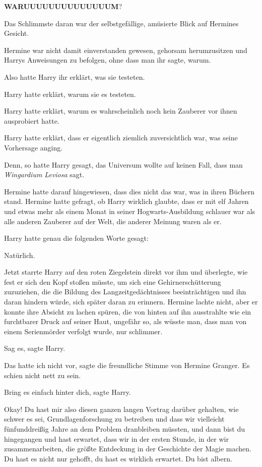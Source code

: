 \textbf{WARUUUUUUUUUUUUUUM}?

Das Schlimmste daran war der selbstgefällige, amüsierte Blick auf Hermines
Gesicht.

Hermine war nicht damit einverstanden gewesen, gehorsam herumzusitzen und Harrys
Anweisungen zu befolgen, ohne dass man ihr sagte, warum.

Also hatte Harry ihr erklärt, was sie testeten.

Harry hatte erklärt, warum sie es testeten.

Harry hatte erklärt, warum es wahrscheinlich noch kein Zauberer vor ihnen
ausprobiert hatte.

Harry hatte erklärt, dass er eigentlich ziemlich zuversichtlich war, was seine
Vorhersage anging.

Denn, so hatte Harry gesagt, das Universum wollte auf keinen Fall, dass man
\emph{\glqq{}Wingardium Leviosa\grqq{}} sagt.

Hermine hatte darauf hingewiesen, dass dies nicht das war, was in ihren Büchern
stand. Hermine hatte gefragt, ob Harry wirklich glaubte, dass er mit elf Jahren
und etwas mehr als einem Monat in seiner Hogwarts-Ausbildung schlauer war als
alle anderen Zauberer auf der Welt, die anderer Meinung waren als er.

Harry hatte genau die folgenden Worte gesagt:

\glqq{}Natürlich.\grqq{}

Jetzt starrte Harry auf den roten Ziegelstein direkt vor ihm und überlegte, wie
fest er sich den Kopf stoßen müsste, um sich eine Gehirnerschütterung
zuzuziehen, die die Bildung des Langzeitgedächtnisses beeinträchtigen und ihn
daran hindern würde, sich später daran zu erinnern. Hermine lachte nicht, aber
er konnte ihre Absicht zu lachen spüren, die von hinten auf ihn ausstrahlte wie
ein furchtbarer Druck auf seiner Haut, ungefähr so, als wüsste man, dass man von
einem Serienmörder verfolgt wurde, nur schlimmer.

\glqq{}Sag es\grqq{}, sagte Harry.

\glqq{}Das hatte ich nicht vor\grqq{}, sagte die freundliche Stimme von Hermine
Granger. \glqq{}Es schien nicht nett zu sein.\grqq{}

\glqq{}Bring es einfach hinter dich\grqq{}, sagte Harry.

\glqq{}Okay! Du hast mir also diesen ganzen langen Vortrag darüber gehalten, wie
schwer es sei, Grundlagenforschung zu betreiben und dass wir vielleicht
fünfunddreißig Jahre an dem Problem dranbleiben müssten, und dann bist du
hingegangen und hast erwartet, dass wir in der ersten Stunde, in der wir
zusammenarbeiten, die größte Entdeckung in der Geschichte der Magie machen. Du
hast es nicht nur gehofft, du hast es wirklich erwartet. Du bist albern.\grqq{}

